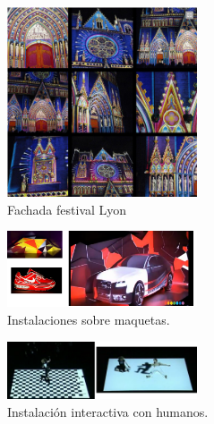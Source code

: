 \begin{figure}[H]
  \centering
    \includegraphics[width=0.5\textwidth]{./Cap1_intro/Fachada1.png}
  \caption[http://www.weltlighting.com/]{Fachada festival Lyon}
  \label{fig:Fachada1}
\end{figure}

\begin{figure}[H]
  \centering
    \includegraphics[width=0.5\textwidth]{./Cap1_intro/instalacion3.png}
  \caption[http:\/\/www.youtube.com\/watch?v=1u3p0JEDzcQ\&feature=related ,http:\/\/www.youtube.com\/watch?v=0Lh4OaaYu9E\&feature=related, http:\/\/www.weltlighting.com\/fragment\/]{Instalaciones sobre maquetas.}
  
  \label{fig:Instalacion}
\end{figure}

\begin{figure}[H]
  \centering
    \includegraphics[width=0.5\textwidth]{./Cap1_intro/instalacionHumano1.png}
  \caption[http://vimeo.com/2774865]{Instalación interactiva con humanos.}
  \label{fig:Interactiva}
\end{figure}


